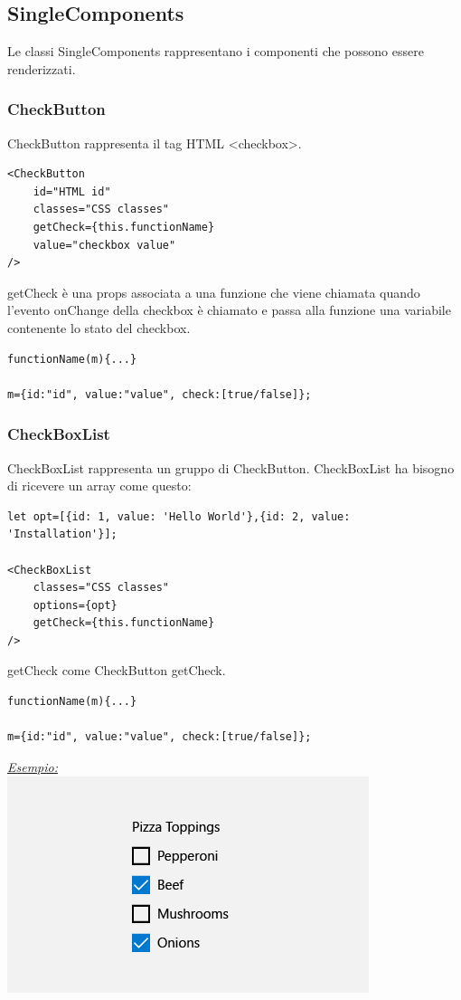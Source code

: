 \subsection{SingleComponents}
Le classi SingleComponents rappresentano i componenti che possono essere renderizzati.
\begin{flushleft}
\subsubsection{CheckButton}
CheckButton rappresenta il tag HTML <checkbox>.
\begin{verbatim}
<CheckButton
	id="HTML id"
	classes="CSS classes"
	getCheck={this.functionName}
	value="checkbox value"
/>
\end{verbatim}
	
getCheck è una props associata a una funzione che viene chiamata quando l'evento onChange della checkbox è chiamato e passa alla funzione una variabile contenente lo stato del checkbox.

\begin{verbatim}
functionName(m){...}

m={id:"id", value:"value", check:[true/false]};
\end{verbatim}


\subsubsection{CheckBoxList}
CheckBoxList rappresenta un gruppo di CheckButton. 
CheckBoxList ha bisogno di ricevere un array come questo: 
\begin{verbatim}
let opt=[{id: 1, value: 'Hello World'},{id: 2, value: 'Installation'}];

<CheckBoxList
	classes="CSS classes"
	options={opt}
	getCheck={this.functionName}
/>
\end{verbatim}
getCheck come CheckButton getCheck.
\begin{verbatim}
functionName(m){...}

m={id:"id", value:"value", check:[true/false]};
\end{verbatim}

\begin{center}

\underline{\textit{Esempio:}}
\\
\includegraphics[scale=0.53]{img/checkbox.png}
\\
\end{center}


\end{flushleft}
